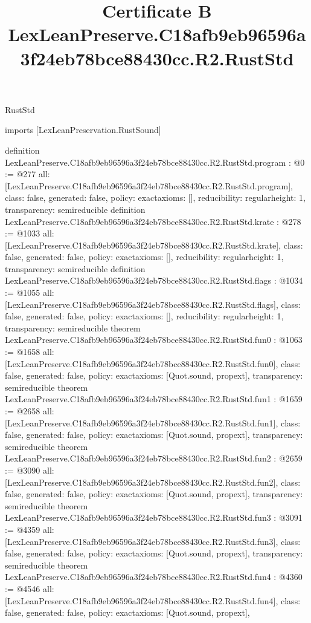 \begin{lexlean}{RustStd}
\title{Certificate B LexLeanPreserve.C18afb9eb96596a3f24eb78bce88430cc.R2.RustStd}
\begin{coremodule}
imports [LexLeanPreservation.RustSound]

definition LexLeanPreserve.C18afb9eb96596a3f24eb78bce88430cc.R2.RustStd.program : @0 := @277 {
  all: [LexLeanPreserve.C18afb9eb96596a3f24eb78bce88430cc.R2.RustStd.program],
  class: false,
  generated: false,
  policy: exact{axioms: []},
  reducibility: regular{height: 1},
  transparency: semireducible
}
definition LexLeanPreserve.C18afb9eb96596a3f24eb78bce88430cc.R2.RustStd.krate : @278 := @1033 {
  all: [LexLeanPreserve.C18afb9eb96596a3f24eb78bce88430cc.R2.RustStd.krate],
  class: false,
  generated: false,
  policy: exact{axioms: []},
  reducibility: regular{height: 1},
  transparency: semireducible
}
definition LexLeanPreserve.C18afb9eb96596a3f24eb78bce88430cc.R2.RustStd.flags : @1034 := @1055 {
  all: [LexLeanPreserve.C18afb9eb96596a3f24eb78bce88430cc.R2.RustStd.flags],
  class: false,
  generated: false,
  policy: exact{axioms: []},
  reducibility: regular{height: 1},
  transparency: semireducible
}
theorem LexLeanPreserve.C18afb9eb96596a3f24eb78bce88430cc.R2.RustStd.fun0 : @1063 := @1658 {
  all: [LexLeanPreserve.C18afb9eb96596a3f24eb78bce88430cc.R2.RustStd.fun0],
  class: false,
  generated: false,
  policy: exact{axioms: [Quot.sound, propext]},
  transparency: semireducible
}
theorem LexLeanPreserve.C18afb9eb96596a3f24eb78bce88430cc.R2.RustStd.fun1 : @1659 := @2658 {
  all: [LexLeanPreserve.C18afb9eb96596a3f24eb78bce88430cc.R2.RustStd.fun1],
  class: false,
  generated: false,
  policy: exact{axioms: [Quot.sound, propext]},
  transparency: semireducible
}
theorem LexLeanPreserve.C18afb9eb96596a3f24eb78bce88430cc.R2.RustStd.fun2 : @2659 := @3090 {
  all: [LexLeanPreserve.C18afb9eb96596a3f24eb78bce88430cc.R2.RustStd.fun2],
  class: false,
  generated: false,
  policy: exact{axioms: [Quot.sound, propext]},
  transparency: semireducible
}
theorem LexLeanPreserve.C18afb9eb96596a3f24eb78bce88430cc.R2.RustStd.fun3 : @3091 := @4359 {
  all: [LexLeanPreserve.C18afb9eb96596a3f24eb78bce88430cc.R2.RustStd.fun3],
  class: false,
  generated: false,
  policy: exact{axioms: [Quot.sound, propext]},
  transparency: semireducible
}
theorem LexLeanPreserve.C18afb9eb96596a3f24eb78bce88430cc.R2.RustStd.fun4 : @4360 := @4546 {
  all: [LexLeanPreserve.C18afb9eb96596a3f24eb78bce88430cc.R2.RustStd.fun4],
  class: false,
  generated: false,
  policy: exact{axioms: [Quot.sound, propext]},
}
\end{coremodule}
\end{lexlean}

